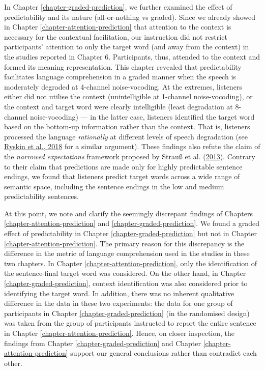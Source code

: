 \documentclass[a4paper, nobind]{templates/ociamthesis}
\begin{document}
In Chapter \ref{chapter-graded-prediction}, we further examined the effect of predictability and its nature (all-or-nothing vs graded).
Since we already showed in Chapter \ref{chapter-attention-prediction} that attention to the context is necessary for the contextual facilitation,
our instruction did not restrict participants' attention to only the target word (and away from the context) in the studies reported in Chapter 6.
Participants, thus, attended to the context and formed its meaning representation.
This chapter revealed that predictability facilitates language comprehension in a graded manner when the speech is moderately degraded at 4-channel noise-vocoding.
At the extremes, listeners either did not utilise the context (unintelligible at 1-channel noise-vocoding),
or the context and target word were clearly intelligible (least degradation at 8-channel noise-vocoding) ---
in the latter case, listeners identified the target word based on the bottom-up information rather than the context.
That is, listeners processed the language \emph{rationally} at different levels of speech degradation (see \protect\hyperlink{ref-Ryskin2018}{Ryskin et al., 2018} for a similar argument).
These findings also refute the claim of the \emph{narrowed expectations} framework proposed by Strauß et al. (\protect\hyperlink{ref-Strauss2013}{2013}).
Contrary to their claim that predictions are made only for highly predictable sentence endings,
we found that listeners predict target words across a wide range of semantic space, including the sentence endings in the low and medium predictability sentences.

At this point, we note and clarify the seemingly discrepant findings of Chapters \ref{chapter-attention-prediction} and \ref{chapter-graded-prediction}.
We found a graded effect of predictability in Chapter \ref{chapter-graded-prediction} but not in Chapter \ref{chapter-attention-prediction}.
The primary reason for this discrepancy is the difference in the metric of language comprehension used in the studies in these two chapters.
In Chapter \ref{chapter-attention-prediction}, only the identification of the sentence-final target word was considered.
On the other hand, in Chapter \ref{chapter-graded-prediction}, context identification was also considered prior to identifying the target word.
In addition, there was no inherent qualitative difference in the data in these two experiments:
the data for one group of participants in Chapter \ref{chapter-graded-prediction} (in the randomised design) was taken from the group of participants instructed to report the entire sentence in Chapter \ref{chapter-attention-prediction}.
Hence, on closer inspection, the findings from Chapter \ref{chapter-graded-prediction} and Chapter \ref{chapter-attention-prediction} support our general conclusions rather than contradict each other.
\end{document}
